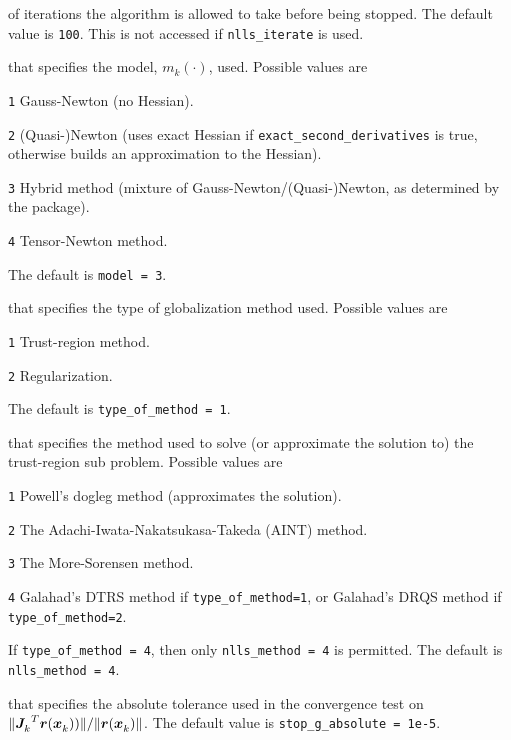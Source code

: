 \begin{description}

of iterations the algorithm is allowed to take before being stopped.  The default value is {\tt 100}.  This is not accessed if {\tt nlls\_iterate} is used.

that specifies the model, $m_k(\cdot)$, used.  Possible values are
\begin{description}
  \item{\tt 1} Gauss-Newton (no Hessian).
  \item{\tt 2} (Quasi-)Newton (uses exact Hessian if {\tt exact\_second\_derivatives} is true, otherwise builds an approximation to the Hessian).
  \item{\tt 3} Hybrid method (mixture of Gauss-Newton/(Quasi-)Newton, as determined by the package).
  \item{\tt 4} Tensor-Newton method.
\end{description}
The default is {\tt model = 3}.

that specifies the type of globalization method used.  Possible values are
\begin{description}
  \item{\tt 1} Trust-region method.
  \item{\tt 2} Regularization.
\end{description}
The default is {\tt type\_of\_method = 1}.

that specifies the method used to solve (or approximate the solution to) the trust-region sub problem.  Possible values are
\begin{description}
  \item{\tt 1} Powell's dogleg method (approximates the solution).
  \item{\tt 2} The Adachi-Iwata-Nakatsukasa-Takeda (AINT) method.
  \item{\tt 3} The More-Sorensen method.
  \item{\tt 4} {\sc Galahad}'s {\sc DTRS} method if {\tt type\_of\_method=1}, or {\sc Galahad}'s {\sc DRQS} method if {\tt type\_of\_method=2}.
\end{description}
If {\tt type\_of\_method = 4}, then only {\tt nlls\_method = 4} is permitted.
The default is {\tt nlls\_method = 4}.

that specifies the absolute tolerance used in the convergence test on \(\|{{\bm J}_{k}^{}}^T{\bm r}({\bm x}_{k}^{}))\|/\|{\bm r}({\bm x}_{k}^{})\|\).
The default value is {\tt stop\_g\_absolute = 1e{-5}}.


\end{description}
